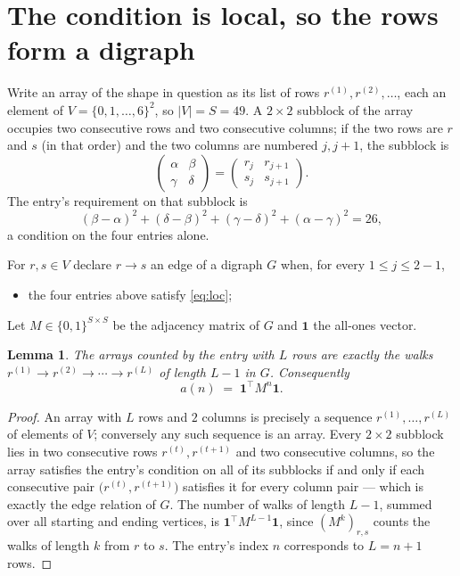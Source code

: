 \documentclass[11pt,a4paper]{article}
\theoremstyle{plain}
\newtheorem{lemma}[theorem]{Lemma}
\theoremstyle{definition}
\begin{document}
\section{The condition is local, so the rows form a digraph}

Write an array of the shape in question as its list of rows
$r^{(1)},r^{(2)},\dots$, each an element of
$V=\{0,1,\dots,6\}^{2}$, so $|V|=S=49$. A $2\times2$ subblock of the array
occupies two consecutive rows and two consecutive columns; if the two rows are $r$
and $s$ (in that order) and the two columns are numbered $j,j+1$,
the subblock is
\[
\begin{pmatrix}\alpha&\beta\\\gamma&\delta\end{pmatrix}=\begin{pmatrix}r_j&r_{j+1}\\s_j&s_{j+1}\end{pmatrix}.
\]
The entry's requirement on that subblock is
\begin{equation}\label{eq:loc}
(\beta-\alpha)^2+(\delta-\beta)^2+(\gamma-\delta)^2+(\alpha-\gamma)^2=26,
\end{equation}
a condition on the four entries alone.

For $r,s\in V$ declare $r\to s$ an edge of a digraph $G$ when, for every
$1\le j\le 2-1$,
\begin{itemize}
\item the four entries above satisfy \eqref{eq:loc};

\end{itemize}
Let $M\in\{0,1\}^{S\times S}$ be the adjacency matrix of $G$ and $\mathbf{1}$ the
all-ones vector.

\begin{lemma}\label{lem:walk}
The arrays counted by the entry with $L$ rows are exactly the walks
$r^{(1)}\to r^{(2)}\to\cdots\to r^{(L)}$ of length $L-1$ in $G$. Consequently
\[
a(n)\;=\;\mathbf{1}^{\!\top}M^{n}\mathbf{1} .
\]
\end{lemma}

\begin{proof}
An array with $L$ rows and $2$ columns is precisely a sequence
$r^{(1)},\dots,r^{(L)}$ of elements of $V$; conversely any such sequence is an array.
Every $2\times2$ subblock lies in two consecutive rows $r^{(t)},r^{(t+1)}$ and two
consecutive columns, so the array satisfies the entry's condition on all of its subblocks
if and only if each consecutive pair $\bigl(r^{(t)},r^{(t+1)}\bigr)$ satisfies it for
every column pair --- which is exactly the edge relation of $G$. The number of walks of
length $L-1$, summed over all starting and ending vertices, is
$\mathbf{1}^{\!\top}M^{L-1}\mathbf{1}$, since $(M^{k})_{r,s}$ counts the walks of
length $k$ from $r$ to $s$. The entry's index $n$ corresponds to $L=n+1$ rows.
\end{proof}
\end{document}
